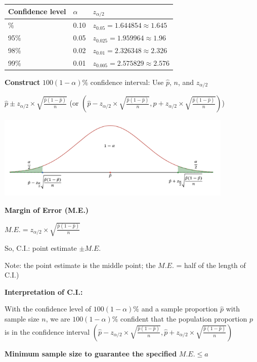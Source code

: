 \documentclass[
]{book}
\begin{document}
\begin{longtable}[]{@{}lll@{}}
\toprule\noalign{}
Confidence level & \(\alpha\) & \(z_{\alpha/2}\) \\
\midrule\noalign{}
\endhead
\bottomrule\noalign{}
\endlastfoot
90\% & 0.10 & \(z_{0.05} = 1.644854 \approx 1.645\) \\
95\% & 0.05 & \(z_{0.025} = 1.959964 \approx 1.96\) \\
98\% & 0.02 & \(z_{0.01} = 2.326348 \approx 2.326\) \\
99\% & 0.01 & \(z_{0.005} = 2.575829 \approx 2.576\) \\
\end{longtable}

\textbf{Construct} \(100(1-\alpha)\%\) confidence interval: Use \(\hat{p}\), \(n\), and \(z_{\alpha/2}\)

\(\hat{p} \pm z_{\alpha/2} \times \sqrt{\frac{\hat{p}(1-\hat{p})}{n}}\) (or \((\hat{p} - z_{\alpha/2} \times \sqrt{\frac{\hat{p}(1-\hat{p})}{n}}, \hat{p} + z_{\alpha/2} \times \sqrt{\frac{\hat{p}(1-\hat{p})}{n}})\))

\includegraphics[width=4.44792in,height=\textheight]{images/img50.png}

\textbf{Margin of Error (M.E.)}

\(M.E. = z_{\alpha/2} \times \sqrt{\frac{\hat{p}(1-\hat{p})}{n}}\)

So, C.I.: point estimate \(\pm M.E.\)

Note: the point estimate is the middle point; the \(M.E.\) = half of the length of C.I.)

\textbf{Interpretation of C.I.:}

With the confidence level of \(100(1-\alpha)\%\) and a sample proportion \(\hat{p}\) with sample size \(n\), we are \(100(1-\alpha)\%\) confident that the population proportion \(p\) is in the confidence interval \((\hat{p} - z_{\alpha/2} \times \sqrt{\frac{\hat{p}(1-\hat{p})}{n}}, \hat{p} + z_{\alpha/2} \times \sqrt{\frac{\hat{p}(1-\hat{p})}{n}})\)

\textbf{Minimum sample size to guarantee the specified} \(M.E. \leq a\)
\end{document}
